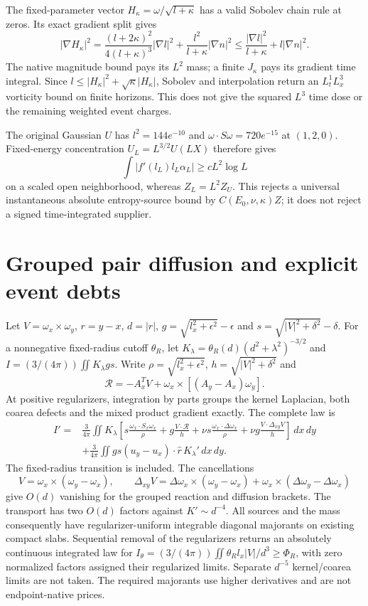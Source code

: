 \documentclass[11pt]{article}
\begin{document}
The fixed-parameter vector $H_\kappa=\omega/\sqrt{l+\kappa}$ has a valid
Sobolev chain rule at zeros. Its exact gradient split gives
\[
 |\nabla H_\kappa|^2
 =\frac{(l+2\kappa)^2}{4(l+\kappa)^3}|\nabla l|^2
     +\frac{l^2}{l+\kappa}|\nabla n|^2
 \le\frac{|\nabla l|^2}{l+\kappa}+l|\nabla n|^2.
\]
The native magnitude bound pays its $L^2$ mass; a finite $J_\kappa$ pays its
gradient time integral. Since $l\le |H_\kappa|^2+\sqrt\kappa|H_\kappa|$,
Sobolev and interpolation return an $L^1_tL^3_x$ vorticity bound on finite
horizons. This does not give the squared $L^3$ time dose or the remaining
weighted event charges.

The original Gaussian $U$ has $l^2=144e^{-10}$ and
$\omega\cdot S\omega=720e^{-15}$ at $(1,2,0)$.
Fixed-energy concentration $U_L=L^{3/2}U(LX)$ therefore gives
\[
 \int|f'(l_L)l_L\alpha_L|\ge cL^2\log L
\]
on a scaled open neighborhood,
whereas $Z_L=L^2Z_U$. This rejects a universal instantaneous absolute
entropy-source bound by $C(E_0,\nu,\kappa)Z$; it does not reject a signed
time-integrated supplier.

\section{Grouped pair diffusion and explicit event debts}
Let $V=\omega_x\times\omega_y$, $r=y-x$, $d=|r|$,
$g=\sqrt{l_x^2+\epsilon^2}-\epsilon$ and
$s=\sqrt{|V|^2+\delta^2}-\delta$. For a nonnegative fixed-radius cutoff
$\theta_R$, let $K_\lambda=\theta_R(d)(d^2+\lambda^2)^{-3/2}$ and
$I=(3/(4\pi))\iint K_\lambda gs$. Write
$\rho=\sqrt{l_x^2+\epsilon^2}$, $h=\sqrt{|V|^2+\delta^2}$ and
\[
 \mathcal R=-A_x^TV+\omega_x\times[(A_y-A_x)\omega_y].
\]
At positive regularizers, integration by parts groups the kernel Laplacian,
both coarea defects and the mixed product gradient exactly. The complete law is
\begin{align*}
 I'={}&\frac3{4\pi}\iint K_\lambda
 \left[s\frac{\omega_x\cdot S_x\omega_x}{\rho}
       +g\frac{V\cdot\mathcal R}{h}
       +\nu s\frac{\omega_x\cdot\Delta\omega_x}{\rho}
       +\nu g\frac{V\cdot\Delta_{xy}V}{h}\right]\,dx\,dy\\
 &+\frac3{4\pi}\iint gs(u_y-u_x)\cdot\widehat r\,K_\lambda'\,dx\,dy.
\end{align*}
The fixed-radius transition is included. The cancellations
\[
 V=\omega_x\times(\omega_y-\omega_x),\qquad
 \Delta_{xy}V=\Delta\omega_x\times(\omega_y-\omega_x)
             +\omega_x\times(\Delta\omega_y-\Delta\omega_x)
\]
give $O(d)$ vanishing for the grouped reaction and diffusion brackets.
The transport has two $O(d)$ factors against $K'\sim d^{-4}$.
All sources and the mass consequently have regularizer-uniform integrable
diagonal majorants on existing compact slabs. Sequential removal of the
regularizers returns an absolutely continuous integrated law for
$I_\theta=(3/(4\pi))\iint\theta_R l_x|V|/d^3\ge\Phi_R$, with zero
normalized factors assigned their regularized limits. Separate $d^{-5}$
kernel/coarea limits are not taken. The required majorants use higher
derivatives and are not endpoint-native prices.
\end{document}
